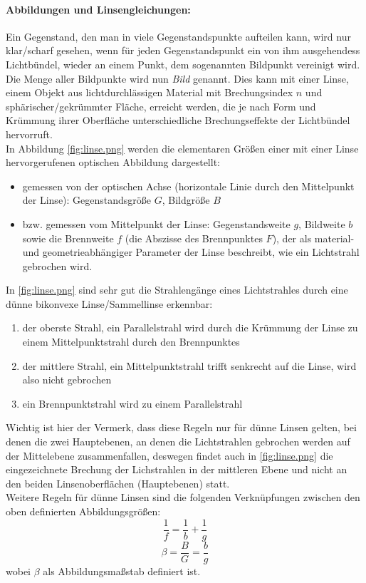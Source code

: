 \paragraph{Abbildungen und Linsengleichungen:}
Ein Gegenstand, den man in viele Gegenstandspunkte aufteilen kann, wird nur klar/scharf gesehen, wenn für jeden Gegenstandspunkt ein von ihm ausgehendess Lichtbündel, wieder an einem Punkt, dem sogenannten Bildpunkt vereinigt wird. Die Menge aller Bildpunkte wird nun \emph{Bild} genannt. Dies kann mit einer Linse, einem Objekt aus lichtdurchlässigen Material mit Brechungsindex \(n\) und sphärischer/gekrümmter Fläche, erreicht werden, die je nach Form und Krümmung ihrer Oberfläche unterschiedliche Brechungseffekte der Lichtbündel hervorruft.\\
In Abbildung \cref{fig:linse.png} werden die elementaren Größen einer mit einer Linse hervorgerufenen optischen Abbildung dargestellt:
\begin{itemize}
    \item gemessen von der optischen Achse (horizontale Linie durch den Mittelpunkt der Linse): Gegenstandsgröße \(G\), Bildgröße \(B\)
    \item bzw. gemessen vom Mittelpunkt der Linse: Gegenstandsweite \(g\), Bildweite \(b\) sowie die Brennweite \(f\) (die Abszisse des Brennpunktes \(F\)), der als material- und geometrieabhängiger Parameter der Linse beschreibt, wie ein Lichtstrahl gebrochen wird.
\end{itemize}

In \cref{fig:linse.png} sind sehr gut die Strahlengänge eines Lichtstrahles durch eine dünne bikonvexe Linse/Sammellinse erkennbar: 
\newpage
\begin{enumerate}
    \item der oberste Strahl, ein Parallelstrahl wird durch die Krümmung der Linse zu einem Mittelpunktstrahl durch den Brennpunktes
    \item der mittlere Strahl, ein Mittelpunktstrahl trifft senkrecht auf die Linse, wird also nicht gebrochen
    \item ein Brennpunktstrahl wird zu einem Parallelstrahl
\end{enumerate}
Wichtig ist hier der Vermerk, dass diese Regeln nur für dünne Linsen gelten, bei denen die zwei Hauptebenen, an denen die Lichtstrahlen gebrochen werden auf der Mittelebene zusammenfallen, deswegen findet auch in \cref{fig:linse.png} die eingezeichnete Brechung der Lichstrahlen in der mittleren Ebene und nicht an den beiden Linsenoberflächen (Hauptebenen) statt.\\
Weitere Regeln für dünne Linsen sind die folgenden Verknüpfungen zwischen den oben definierten Abbildungsgrößen:
\begin{equation}
    \frac{1}{f}=\frac{1}{b}+\frac{1}{g}
    \label{eq:f}
\end{equation}
\begin{equation}
    \beta=\frac{B}{G}=\frac{b}{g}
    \label{eq:beta}
\end{equation}
wobei \(\beta\) als Abbildungsmaßstab definiert ist.

